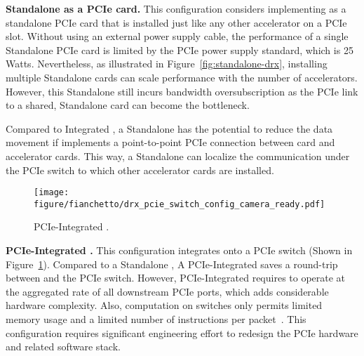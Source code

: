 \noindent\textbf{Standalone \drx as a PCIe card.}
This configuration considers implementing \drx as a standalone PCIe card that is installed just like any other accelerator on a PCIe slot. 
%
%
Without using an external power supply cable, the performance of a single Standalone \drx PCIe card is limited by the PCIe power supply standard, which is 25 Watts.
%
Nevertheless, as illustrated in Figure~\ref{fig:standalone-drx}, installing multiple Standalone \drx cards can scale \drx performance with the number of accelerators. 
%
However, this Standalone \drx still incurs bandwidth oversubscription as the PCIe link to a shared, Standalone \drx card can become the bottleneck. 
%

Compared to Integrated \drx, a Standalone \drx has the potential to reduce the data movement if \dmx implements a point-to-point PCIe connection between \drx card and accelerator cards. This way, a Standalone \drx can localize the communication under the PCIe switch to which other accelerator cards are installed. 

\begin{figure}[ht!]
    \centering
    \texttt{[image: figure/fianchetto/drx\_pcie\_switch\_config\_camera\_ready.pdf]}
    \caption{PCIe-Integrated \drx.} 
    \label{fig:drx-config-on-pcie-switch}
\end{figure}

\noindent\textbf{PCIe-Integrated \drx.}
This configuration integrates \drx onto a PCIe switch (Shown in Figure~\ref{fig:drx-config-on-pcie-switch}).
%
Compared to a Standalone \drx, A PCIe-Integrated \drx saves a round-trip between \drx and the PCIe switch.  
%
However, PCIe-Integrated \drx requires \drx to operate at the aggregated rate of all downstream PCIe ports, which adds considerable hardware complexity. 
%
Also, computation on switches only permits limited memory usage and a limited number of instructions per packet~\cite{rmt:sigcomm:2013,drmt:sigcomm:2017,in-network-compute:hotnets:2017,in-network-compute:eurosys:2019}. 
%
This configuration requires significant engineering effort to redesign the PCIe hardware and related software stack. 


